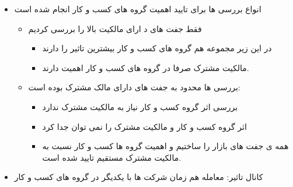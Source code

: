 \documentclass[12pt, a4paper]{article}
\begin{document}
\begin{itemize}
\item 
انواع بررسی ها برای تایید اهمیت گروه های کسب و کار انجام شده است 
\begin{itemize}

\item
فقط جفت  های د ارای مالکیت بالا را بررسی کردیم
\begin{itemize}
\item 
در این زیر مجموعه هم گروه های کسب و کار بیشترین تاثیر را دارند 
\item
مالکیت مشترک صرفا در گروه های کسب و کار اهمیت دارند.

\end{itemize}
\item
بررسی ها محدود به جفت های دارای مالک مشترک بوده است:
\begin{itemize}
\item
بررسی اثر گروه کسب و کار نیاز به مالکیت مشترک ندارد
\item
اثر گروه کسب و کار و مالکیت مشترک را نمی توان جدا کرد
\item 
همه ی جفت های بازار را ساختیم و اهمیت گروه ها کسب و کار نسبت به مالکیت مشترک مستقیم تایید شده است.
\end{itemize}

\end{itemize}


	\item
کانال تاثیر: معامله هم زمان شرکت ها با یکدیگر در گروه های کسب و کار
\begin{itemize}


\end{itemize}
\end{itemize}
\end{document}

